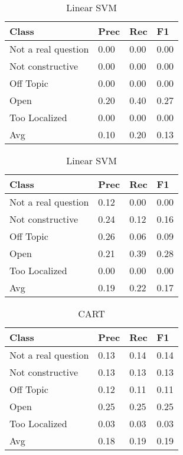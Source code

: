 \begin{table}[!htpb]
\centering
\begin{minipage}{.5\linewidth}
    \begin{tabular}{|l|l|l|l|} \hline
    \textbf{Class}& \textbf{Prec} & \textbf{Rec} & \textbf{F1} \\ \hline
    Not a real question & 0.00      & 0.00   & 0.00     \\
    Not constructive    & 0.00      & 0.00   & 0.00     \\
    Off Topic           & 0.00      & 0.00   & 0.00     \\
    Open                & 0.20      & 0.40   & 0.27     \\
    Too Localized       & 0.00      & 0.00   & 0.00     \\ \hline
    Avg                 & 0.10      & 0.20   & 0.13   \\ \hline   
    \end{tabular}
    \caption{Radial SVM}
    \label{tab2:rsvm}
\end{minipage}%
\begin{minipage}{.5\linewidth}
    \begin{tabular}{|l|l|l|l|} \hline
    \textbf{Class}& \textbf{Prec} & \textbf{Rec} & \textbf{F1} \\ \hline
    Not a real question & 0.12      & 0.00   & 0.00     \\
    Not constructive    & 0.24      & 0.12   & 0.16     \\
    Off Topic           & 0.26      & 0.06   & 0.09     \\
    Open                & 0.21      & 0.39   & 0.28     \\
    Too Localized       & 0.00      & 0.00   & 0.00     \\ \hline
    Avg                 & 0.19      & 0.22   & 0.17   \\ \hline  
    \end{tabular}
    \caption{Linear SVM}
    \label{tab2:lsvm}
\end{minipage}

\end{table}

\begin{table}[!htpb]
\centering
\begin{tabular}{|l|l|l|l|} \hline
\textbf{Class}& \textbf{Prec} & \textbf{Rec} & \textbf{F1} \\ \hline
Not a real question & 0.13      & 0.14   & 0.14     \\
Not constructive    & 0.13      & 0.13   & 0.13     \\
Off Topic           & 0.12     & 0.11   & 0.11     \\
Open                & 0.25      & 0.25   & 0.25     \\
Too Localized       & 0.03      & 0.03   & 0.03     \\ \hline
Avg                 & 0.18      & 0.19   & 0.19   \\ \hline  
\end{tabular}
\caption{CART}
\label{tab2:cart}
\end{table}